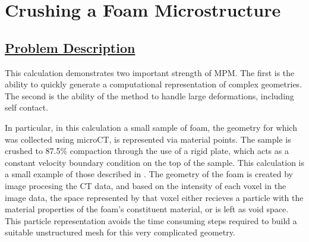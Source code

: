 \documentclass[fleqn]{article}
\begin{document}
\section*{\center Crushing a Foam Microstructure}
\subsection*{\underline{Problem Description}}
This calculation demonstrates two important strength of MPM.  The first
is the ability to quickly generate a computational representation of
complex geometries.  The second is the ability of the method to handle
large deformations, including self contact.

In particular, in this calculation a small sample of foam, the geometry
for which was collected using microCT, is represented via material points.
The sample is crushed to 87.5\% compaction through the use of a rigid plate, which
acts as a constant velocity boundary condition on the top of the sample.  This
calculation is a small example of those described in \cite{brydonfoam}.  The
geometry of the foam is created by image procesing the CT data, and based
on the intensity of each voxel in the image data, the space represented
by that voxel either recieves a particle with the material properties of the
foam's constituent material, or is left as void space.  This particle
representation avoids the time consuming steps required to build a suitable
unstructured mesh for this very complicated geometry.
 
\end{document}
